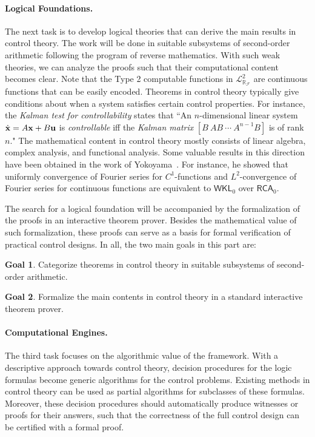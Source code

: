 \documentclass[10pt]{article}
\newcommand{\lrf}{\mathcal{L}_{\mathbb{R}_{\mathcal{F}}}}
\theoremstyle{definition}
\newtheorem{goal}{Goal}
\begin{document}
\paragraph{Logical Foundations.}

The next task is to develop logical theories that can derive the main results in control theory.
The work will be done in suitable subsystems of second-order arithmetic following the program of reverse mathematics. With such weak theories, we can analyze the proofs such that their computational content becomes clear. Note that the Type 2 computable functions in  $\lrf^2$ are continuous functions that can be easily encoded. Theorems in control theory typically give conditions about when a system satisfies certain control properties. For instance, the {\em Kalman test for controllability} states that ``An $n$-dimensional linear system $\dot {\bf x} = A{\bf x}+B{\bf u}$ is {\em controllable} iff the {\em Kalman matrix}
$[B\ AB\ \cdots\ A^{n-1}B]$ is of rank $n$." The mathematical content in control theory mostly consists of linear algebra, complex analysis, and functional analysis. Some valuable results in this direction have been obtained in the work of Yokoyama~\cite{yoko}. For instance, he showed that uniformly convergence of Fourier series for $C^1$-functions and $L^2$-convergence of Fourier series for continuous functions are equivalent to $\mathsf{WKL}_0$ over $\mathsf{RCA}_0$. 

The search for a logical foundation will be accompanied by the formalization of the proofs in an interactive theorem prover. Besides the mathematical value of such formalization, these proofs can serve as a basis for formal verification of practical control designs. In all, the two main goals in this part are:
\begin{goal}
Categorize theorems in control theory in suitable subsystems of second-order arithmetic. 
\end{goal}
\begin{goal}
Formalize the main contents in control theory in a standard interactive theorem prover.  
\end{goal}


\paragraph{Computational Engines.}

The third task focuses on the algorithmic value of the framework. With a descriptive approach towards control theory, decision procedures for the logic formulas become generic algorithms for the control problems. Existing methods in control theory can be used as partial algorithms for subclasses of these formulas. Moreover, these decision procedures should automatically produce witnesses or proofs for their answers, such that the correctness of the full control design can be certified with a formal proof.
\end{document}
